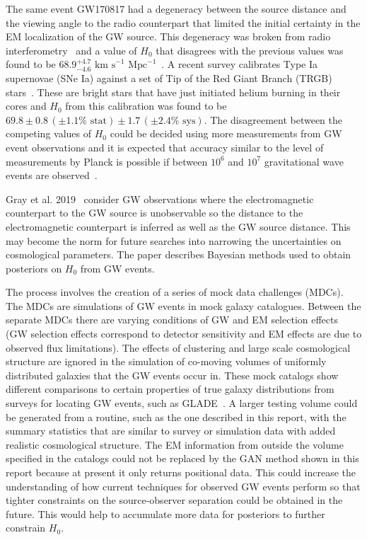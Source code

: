 \documentclass[twocolumn]{article}
\numberwithin{equation}{section}
\begin{document}
The same event GW170817 had a degeneracy between the source distance and the viewing angle to the radio counterpart that 
limited the initial certainty in the EM localization of the GW source. This degeneracy was broken from radio 
interferometry~\cite{GW170817_source_radio} and a value of $H_0$ that disagrees with the previous values was found to be 
$68.9^{+4.7}_{-4.6} \text{ km s}^{-1} \text{ Mpc}^{-1}$~\cite{GW170817_jet_H0}. A recent survey calibrates Type Ia 
supernovae (SNe Ia) against a set of Tip of the Red Giant Branch (TRGB) stars~\cite{H0_redgiant}. These are bright stars
that have just initiated helium burning in their cores and $H_0$ from this calibration was found to be $69.8 \pm 0.8 \, 
(\pm1.1\% \text{ stat}) \pm 1.7 \, (\pm2.4\% \text{ sys})$. The disagreement between the competing values of $H_0$ could
be decided using more measurements from GW event observations and it is expected that accuracy similar to the level of
measurements by Planck is possible if between $10^6$ and $10^7$ gravitational wave events are 
observed~\cite{chris_planck_gw}.

Gray et al. 2019~\cite{gray} consider GW observations where the electromagnetic counterpart to the GW source is
unobservable so the distance to the electromagnetic counterpart is inferred as well as the GW source distance. This 
may become the norm for future searches into narrowing the uncertainties on cosmological parameters. The paper 
describes Bayesian methods used to obtain posteriors on $H_0$ from GW events.

The process involves the creation of a series of mock data challenges (MDCs). The MDCs are simulations of GW events 
in mock galaxy catalogues. Between the separate MDCs there are varying conditions of GW and EM selection effects 
(GW selection effects correspond to detector sensitivity and EM effects are due to observed flux limitations). The 
effects of clustering and large scale cosmological structure are ignored in the simulation of co-moving volumes of 
uniformly distributed galaxies that the GW events occur in. These mock catalogs show different comparisons to 
certain properties of true galaxy distributions from surveys for locating GW events, such as GLADE~\cite{GLADE}. %
A larger testing volume could be generated from a routine, such as the one described in this report, with the summary 
statistics that are similar to survey or simulation data with added realistic cosmological structure. The EM 
information from outside the volume specified in the catalogs could not be replaced by the GAN method shown in this 
report because at present it only returns positional data. This could increase the understanding of how current 
techniques for observed GW events perform so that tighter constraints on the source-observer separation could be 
obtained in the future. This would help to accumulate more data for posteriors to further constrain $H_0$.
\end{document}
